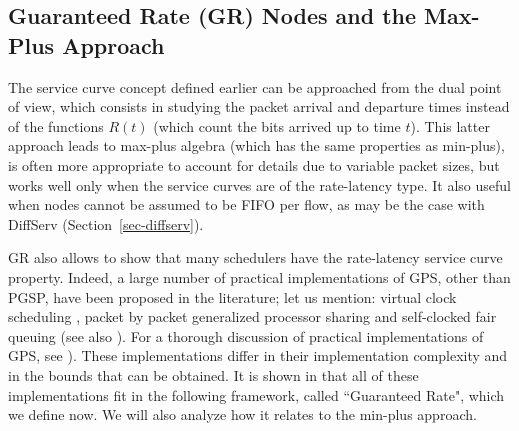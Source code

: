 %

\subsection{Guaranteed Rate (GR) Nodes and the Max-Plus Approach}

The service curve concept defined earlier can be approached from
the dual point of view, which consists in studying the packet
arrival and departure times instead of the functions $R(t)$ (which
count the bits arrived up to time $t$). This latter approach leads
to max-plus algebra (which has the same properties as min-plus),
is often more appropriate to account for details due to variable
packet sizes, but works well only when the service curves are of
the rate-latency type. It also useful when nodes cannot be assumed
to be FIFO per flow, as may be the case with DiffServ
(Section~\ref{sec-diffserv}).

GR also allows to show that many schedulers have the rate-latency
service curve property. Indeed, a large number of practical
implementations of GPS, other than PGSP, have been proposed in the
literature; let us mention: virtual clock scheduling \cite{zha90},
packet by packet generalized processor sharing \cite{pg93} and
self-clocked fair queuing \cite{gol94}(see also \cite{gue96}). For
a thorough discussion of practical implementations of GPS, see
\cite{zha96, gue96}). These implementations differ in their
implementation complexity and in the bounds that can be obtained.
It is shown in \cite{GLV95} that all of these implementations fit
in the following framework, called ``Guaranteed Rate", which we
define now. We will also analyze how it relates to the min-plus
approach.

